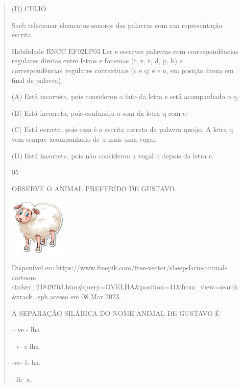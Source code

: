 \begin{verse}
{{{{{{(D) CUIJO.

Saeb relacionar elementos sonoros das palavras com sua representação
escrita.

Habilidade BNCC EF02LP03 Ler e escrever palavras com correspondências
regulares diretas entre letras e fonemas (f, v, t, d, p, b) e
correspondências~regulares contextuais (c e q; e e o, em posição átona
em final de palavra).

(A) Está incorreta, pois considerou o fato da letra e está acompanhado o
q.

(B) Está incorreta, pois confundiu o som da letra q com c.

(C) Está correta, pois essa é a escrita correta da palavra queijo. A
letra q vem sempre acompanhado de u mais uma vogal.

(D) Está incorreta, pois não considerou a vogal u depois da letra c.

\num{05}

OBSERVE O ANIMAL PREFERIDO DE GUSTAVO.

\includegraphics[width=1.11458in,height=1.13889in]{media/image142.jpeg}

Disponível
em:https://www.freepik.com/free-vector/sheep-farm-animal-cartoon-sticker\_21849763.htm\#query=OVELHA\&position=41\&from\_view=search\&track=sph.acesso
em 08 Mar 2023.

A SEPARAÇÃO SILÁBICA DO NOME ANIMAL DE GUSTAVO É

\begin{escolha}
\itemo -- ve - lha

\itemo- v- e-lha.

\itemo-ve- l- ha.

\itemve- lh- a.
\end{escolha}

}}}}}}
\end{verse}
